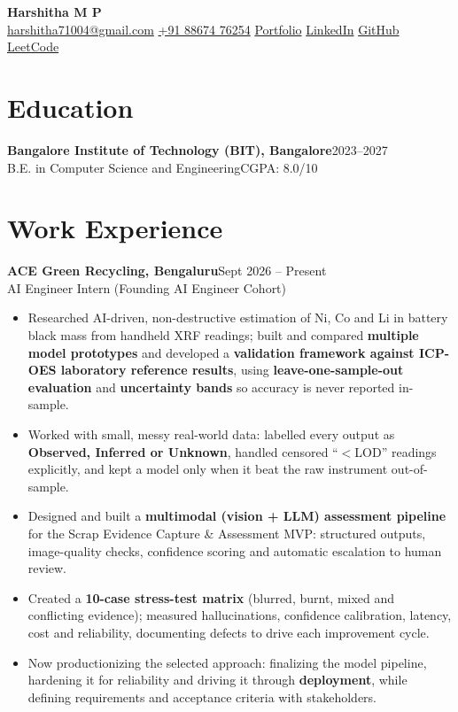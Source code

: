 \documentclass[letterpaper,10pt]{article}
\newcommand{\entry}[4]{%
  \vspace{2pt}\noindent\textbf{#1}\hfill #2\\
  #3\hfill #4\par\vspace{-1pt}}
\begin{document}
\begin{center}
  {\LARGE\bfseries Harshitha M P}\\[4pt]
  \small
  \href{mailto:harshitha71004@gmail.com}{harshitha71004@gmail.com}\quad
  \href{tel:+918867476254}{+91 88674 76254}\quad
  \href{https://harshitha7104.github.io/PORTFOLIO/}{Portfolio}\quad
  \href{https://www.linkedin.com/in/harshitha-m-p-81b734262/}{LinkedIn}\quad
  \href{https://github.com/harshitha7104}{GitHub}\quad
  \href{https://leetcode.com/u/harshitha056/}{LeetCode}
\end{center}

\section{Education}
\entry{Bangalore Institute of Technology (BIT), Bangalore}{2023--2027}{B.E. in Computer Science and Engineering}{CGPA: 8.0/10}

\section{Work Experience}

\entry{ACE Green Recycling, Bengaluru}{Sept 2026 -- Present}{AI Engineer Intern (Founding AI Engineer Cohort)}{}
\begin{itemize}
  \small
  \item Researched AI-driven, non-destructive estimation of Ni, Co and Li in battery black mass from handheld XRF readings; built and compared \textbf{multiple model prototypes} and developed a \textbf{validation framework against ICP-OES laboratory reference results}, using \textbf{leave-one-sample-out evaluation} and \textbf{uncertainty bands} so accuracy is never reported in-sample.
  \item Worked with small, messy real-world data: labelled every output as \textbf{Observed, Inferred or Unknown}, handled censored ``$<$LOD'' readings explicitly, and kept a model only when it beat the raw instrument out-of-sample.
  \item Designed and built a \textbf{multimodal (vision + LLM) assessment pipeline} for the Scrap Evidence Capture \& Assessment MVP: structured outputs, image-quality checks, confidence scoring and automatic escalation to human review.
  \item Created a \textbf{10-case stress-test matrix} (blurred, burnt, mixed and conflicting evidence); measured hallucinations, confidence calibration, latency, cost and reliability, documenting defects to drive each improvement cycle.
  \item Now productionizing the selected approach: finalizing the model pipeline, hardening it for reliability and driving it through \textbf{deployment}, while defining requirements and acceptance criteria with stakeholders.
\end{itemize}
\end{document}
